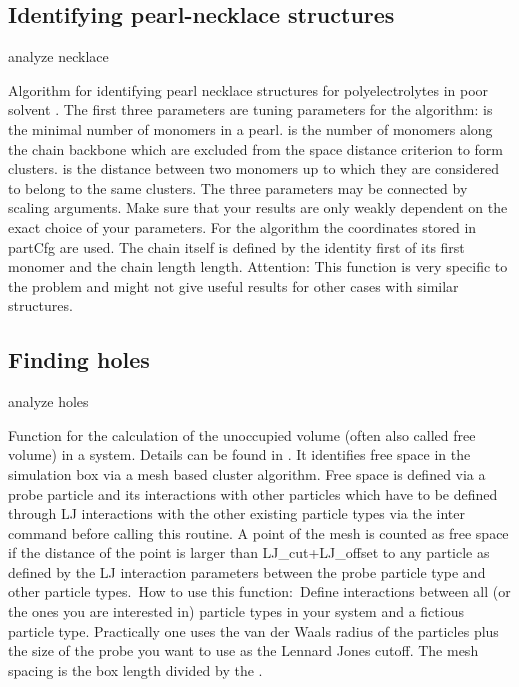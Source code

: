 \subsection{Identifying pearl-necklace structures}
\label{analyze:necklace}

\begin{essyntax}
 analyze necklace   
  
\end{essyntax}
Algorithm for identifying pearl necklace structures for
polyelectrolytes in poor solvent \citep{limbach03a}. The first three
parameters are tuning parameters for the algorithm:
 is the minimal number of monomers in a pearl.
 is the number of monomers along the chain backbone
which are excluded from the space distance criterion to form clusters.
 is the distance between two monomers up to which they
are considered to belong to the same clusters. The three parameters
may be connected by scaling arguments. Make sure that your results are
only weakly dependent on the exact choice of your parameters. For the
algorithm the coordinates stored in partCfg are used. The chain itself
is defined by the identity first of its first monomer and the chain
length length.  Attention: This function is very specific to the
problem and might not give useful results for other cases with similar
structures.


\subsection{Finding holes}
\label{analyze:holes}

\begin{essyntax}
  analyze holes   
\end{essyntax}
Function for the calculation of the unoccupied volume (often also
called free volume) in a system. Details can be found in
\citet{schmitz00a}.  It identifies free space in the simulation box
via a mesh based cluster algorithm.  Free space is defined via a probe
particle and its interactions with other particles which have to be
defined through LJ interactions with the other existing particle types
via the inter command before calling this routine. A point of the mesh
is counted as free space if the distance of the point is larger than
LJ_cut+LJ_offset to any particle as defined by the LJ interaction
parameters between the probe particle type and other particle types.\
How to use this function:\ Define interactions between all (or the
ones you are interested in) particle types in your system and a
fictious particle type.  Practically one uses the van der Waals radius
of the particles plus the size of the probe you want to use as the
Lennard Jones cutoff. The mesh spacing is the box length divided by
the \var{mesh_size}.

